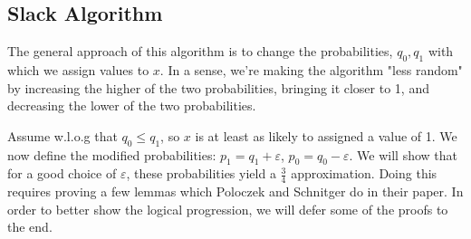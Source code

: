 \documentclass[11pt,letter]{article}
\numberwithin{theorem}{section}
\begin{document}
\subsection*{Slack Algorithm}
The general approach of this algorithm is to change the probabilities, $q_0, q_1$ with which we assign values to $x$. In a sense, we're making the algorithm "less random" by increasing the higher of the two probabilities, bringing it closer to 1, and decreasing the lower of the two probabilities.

Assume w.l.o.g that $q_0 \le q_1$, so $x$ is at least as likely to assigned a value of 1. We now define the modified probabilities: $p_1 = q_1 + \varepsilon$, $p_0 = q_0 - \varepsilon$. We will show that for a good choice of $\varepsilon$, these probabilities yield a $\frac{3}{4}$ approximation. Doing this requires proving a few lemmas which Poloczek and Schnitger do in their paper. In order to better show the logical progression, we will defer some of the proofs to the end.
\end{document}
